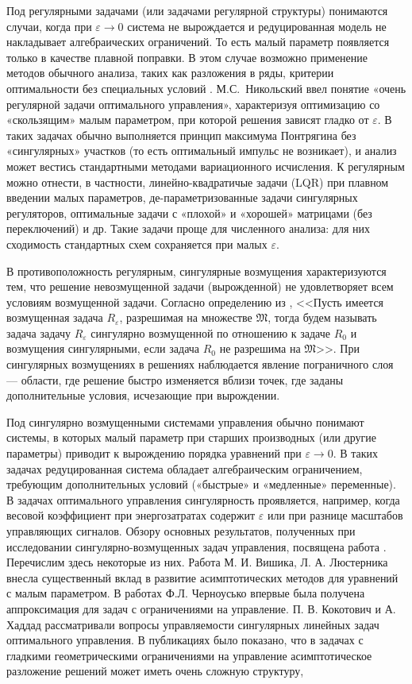 \documentclass[../main.tex]{subfiles}
\begin{document}
Под регулярными задачами (или задачами регулярной структуры) понимаются случаи, когда при $\varepsilon\to0$ система не вырождается и редуцированная модель не накладывает алгебраических ограничений. 
То есть малый параметр появляется только в качестве плавной поправки. 
В этом случае возможно применение методов обычного анализа, таких как разложения в ряды, критерии оптимальности без специальных условий \cite{Haratishvili}. 
М.С. Никольский \cite{Nikolski} ввел понятие «очень регулярной задачи оптимального управления», характеризуя оптимизацию со «скользящим» малым параметром, при которой решения зависят гладко от $\varepsilon$. 
В таких задачах обычно выполняется принцип максимума Понтрягина без «сингулярных» участков (то есть оптимальный импульс не возникает), и анализ может вестись стандартными методами вариационного исчисления. 
К регулярным можно отнести, в частности, линейно-квадратичые задачи (LQR) при плавном введении малых параметров, де-параметризованные задачи сингулярных регуляторов, оптимальные задачи с «плохой» и «хорошей» матрицами (без переключений) и др. 
Такие задачи проще для численного анализа: для них сходимость стандартных схем сохраняется при малых $\varepsilon$.

В противоположность регулярным, сингулярные возмущения характеризуются тем, что решение невозмущенной задачи (вырожденной) не удовлетворяет всем условиям возмущенной задачи. 
Согласно определению из \cite{Vasilieva} , <<Пусть имеется возмущенная задача $R_{\varepsilon}$, разрешимая на множестве $ \mathfrak{M}$, тогда будем называть задача задачу $R_{\varepsilon}$  сингулярно возмущенной по отношению к задаче $R_0$ и возмущения сингулярными, если задача $R_0$ не разрешима на $ \mathfrak{M}$>>. 
При сингулярных возмущениях в решениях наблюдается явление пограничного слоя --- области, где решение быстро изменяется вблизи точек, где заданы дополнительные условия, исчезающие при вырождении.


Под сингулярно возмущенными системами управления обычно понимают системы, в которых малый параметр при старших производных (или другие параметры) приводит к вырождению порядка уравнений при $\varepsilon\to0$. 
В таких задачах редуцированная система обладает алгебраическим ограничением, требующим дополнительных условий («быстрые» и «медленные» переменные). 
В задачах оптимального управления сингулярность проявляется, например, когда весовой коэффициент при энергозатратах содержит $\varepsilon$ или при разнице масштабов управляющих сигналов. 
Обзору основных результатов, полученных при исследовании сингулярно-возмущенных задач управления, посвящена работа \cite{Dmitriev}.
Перечислим здесь некоторые из них. 
Работа М. И. Вишика, Л. А. Люстерника \cite{Vishik} внесла существенный вклад в развитие асимптотических методов для уравнений с малым параметром. 
В работах Ф.Л. Черноусько \cite{Chernousko1968, Chernousko1977} впервые была получена аппроксимация для задач с ограничениями на управление.
П. В. Кокотович и А. Хаддад  \cite{Kokotovic} рассматривали вопросы управляемости сингулярных линейных задач оптимального управления.
В публикациях \cite{Ilyin1989, Ilyin1998} было показано, что в задачах с гладкими геометрическими ограничениями на управление  асимптотическое разложение решений может иметь очень сложную структуру,
\end{document}
